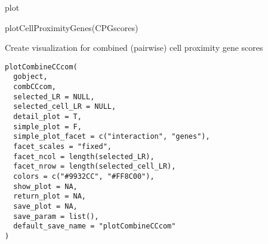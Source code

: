 \documentclass[a4paper]{book}
\begin{document}
%
\begin{Value}
plot
\end{Value}
%
\begin{Examples}
\begin{ExampleCode}
    plotCellProximityGenes(CPGscores)
\end{ExampleCode}
\end{Examples}
%
\begin{Description}\relax
Create visualization for combined (pairwise) cell proximity gene scores
\end{Description}
%
\begin{Usage}
\begin{verbatim}
plotCombineCCcom(
  gobject,
  combCCcom,
  selected_LR = NULL,
  selected_cell_LR = NULL,
  detail_plot = T,
  simple_plot = F,
  simple_plot_facet = c("interaction", "genes"),
  facet_scales = "fixed",
  facet_ncol = length(selected_LR),
  facet_nrow = length(selected_cell_LR),
  colors = c("#9932CC", "#FF8C00"),
  show_plot = NA,
  return_plot = NA,
  save_plot = NA,
  save_param = list(),
  default_save_name = "plotCombineCCcom"
)
\end{verbatim}
\end{Usage}
%
\end{document}
